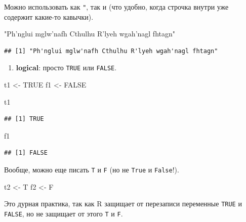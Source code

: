 \documentclass[
]{book}
\newenvironment{Shaded}{\begin{snugshade}}{\end{snugshade}}
\newcommand{\NormalTok}[1]{#1}
\newcommand{\OtherTok}[1]{\textcolor[rgb]{0.56,0.35,0.01}{#1}}
\newcommand{\StringTok}[1]{\textcolor[rgb]{0.31,0.60,0.02}{#1}}
\providecommand{\tightlist}{%
  \setlength{\itemsep}{0pt}\setlength{\parskip}{0pt}}
\begin{document}
Можно использовать как \texttt{"}, так и \texttt{\textquotesingle{}} (что удобно, когда строчка внутри уже содержит какие-то кавычки).

\begin{Shaded}
\begin{Highlighting}[]
\StringTok{"Ph'nglui mglw'nafh Cthulhu R'lyeh wgah'nagl fhtagn"}
\end{Highlighting}
\end{Shaded}

\begin{verbatim}
## [1] "Ph'nglui mglw'nafh Cthulhu R'lyeh wgah'nagl fhtagn"
\end{verbatim}

\begin{enumerate}
\def\labelenumi{\arabic{enumi}.}
\setcounter{enumi}{1}
\tightlist
\item
  \textbf{logical}: просто \texttt{TRUE} или \texttt{FALSE}.
\end{enumerate}

\begin{Shaded}
\begin{Highlighting}[]
\NormalTok{t1 <-}\StringTok{ }\OtherTok{TRUE}
\NormalTok{f1 <-}\StringTok{ }\OtherTok{FALSE}

\NormalTok{t1}
\end{Highlighting}
\end{Shaded}

\begin{verbatim}
## [1] TRUE
\end{verbatim}

\begin{Shaded}
\begin{Highlighting}[]
\NormalTok{f1}
\end{Highlighting}
\end{Shaded}

\begin{verbatim}
## [1] FALSE
\end{verbatim}

Вообще, можно еще писать \texttt{T} и \texttt{F} (но не \texttt{True} и \texttt{False}!).

\begin{Shaded}
\begin{Highlighting}[]
\NormalTok{t2 <-}\StringTok{ }\NormalTok{T}
\NormalTok{f2 <-}\StringTok{ }\NormalTok{F}
\end{Highlighting}
\end{Shaded}

Это дурная практика, так как R защищает от перезаписи переменные \texttt{TRUE} и \texttt{FALSE}, но не защищает от этого \texttt{T} и \texttt{F}.
\end{document}
